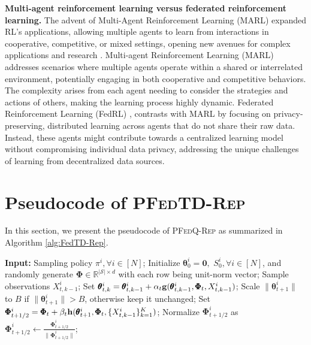 \documentclass{article} %
\theoremstyle{plain}
\theoremstyle{definition}
\theoremstyle{remark}
\newcommand{\cS}{\mathcal{S}}
\newcommand{\FedTD}{\textsc{PFedTD-Rep}\xspace}
\begin{document}
{\textbf{Multi-agent reinforcement learning versus federated reinforcement learning.} The advent of Multi-Agent Reinforcement Learning (MARL) expanded RL's applications, allowing multiple agents to learn from interactions in cooperative, competitive, or mixed settings, opening new avenues for complex applications and research \citep{zhang2021multi}. Multi-agent Reinforcement Learning (MARL) addresses scenarios where multiple agents operate within a shared or interrelated environment, potentially engaging in both cooperative and competitive behaviors. The complexity arises from each agent needing to consider the strategies and actions of others, making the learning process highly dynamic. Federated Reinforcement Learning (FedRL) \citep{qi2021federated}, contrasts with MARL by focusing on privacy-preserving, distributed learning across agents that do not share their raw data. Instead, these agents might contribute towards a centralized learning model without compromising individual data privacy, addressing the unique challenges of learning from decentralized data sources. 




\section{Pseudocode of \FedTD}\label{sec:fedTD}

In this section, we present the pseudocode of  \textsc{PFedQ-Rep} as summarized in Algorithm \ref{alg:FedTD-Rep}.  


\begin{algorithm}[t]
\caption{\FedTD} 
	\label{alg:FedTD-Rep}
	
	\begin{algorithmic}[1]
 \STATE \textbf{Input:} Sampling policy $\pi^i, \forall i\in[N]$;
 \STATE Initialize $\pmb{\theta}_0^i=\pmb{0},$ $S_0^i,\forall i\in[N]$, and randomly generate $\pmb{\Phi}\in\mathbb{R}^{|\cS|\times d}$  with each row being unit-norm vector;
        \STATE Sample observations $X_{t, k-1}^i$;
        \STATE %
        Set 
        $\pmb{\theta}_{t,k}^i=\pmb{\theta}_{t,k-1}^i+\alpha_t {\mathbf{g}}(\pmb{\theta}_{t,k-1}^i,  \pmb{\Phi}_t, X_{t,k-1}^i)$;
        \ENDFOR
        \STATE Scale $\|\pmb{\theta}_{t+1}^i\|$ to $B$ if  $\|\pmb{\theta}_{t+1}^i\|>B$, otherwise keep it unchanged;
         \STATE %
         Set $\pmb{\Phi}_{t+1/2}^i=\pmb{\Phi}_{t}+\beta_t \mathbf{h}(\pmb{\theta}_{t+1}^i, \pmb{\Phi}_t, \{X_{t,k-1}^i\}_{k=1}^K)$;
        \STATE Normalize $\pmb{\Phi}_{t+1/2}^i$ as $\pmb{\Phi}_{t+1/2}^i\leftarrow \frac{\pmb{\Phi}_{t+1/2}^i}{\|\pmb{\Phi}_{t+1/2}^i\|}$;
        

\end{algorithmic}
\end{algorithm}}
\end{document}
